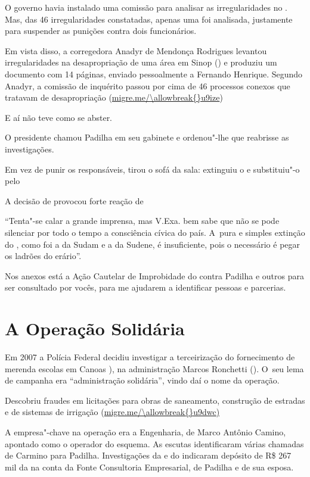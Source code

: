 O governo havia instalado uma comissão para analisar as irregularidades
no . Mas, das 46 irregularidades constatadas, apenas uma foi
analisada, justamente para suspender as punições contra dois
funcionários.

Em vista disso, a corregedora Anadyr de Mendonça Rodrigues levantou
irregularidades na desapropriação de uma área em Sinop () e produziu
um documento com 14 páginas, enviado pessoalmente a Fernando Henrique.
Segundo Anadyr, a comissão de inquérito passou por cima de 46 processos
conexos que tratavam de desapropriação (\url{migre.me/\allowbreak{}u9ize})

E aí  não teve como se abster.

O presidente chamou Padilha em seu gabinete e ordenou"-lhe que reabrisse
as investigações.

Em vez de punir os responsáveis,  tirou o sofá da sala: extinguiu o
 e substituiu"-o pelo 

A decisão de  provocou forte reação de 

``Tenta"-se calar a grande imprensa, mas V.Exa. bem sabe que não se pode
silenciar por todo o tempo a consciência cívica do país. A~pura e
simples extinção do , como foi a da Sudam e a da Sudene, é
insuficiente, pois o necessário é pegar os ladrões do erário''.

Nos anexos está a Ação Cautelar de Improbidade do  contra Padilha e
outros para ser consultado por vocês, para me ajudarem a identificar
pessoas e parcerias.

\section{A Operação Solidária}

Em 2007 a Polícia Federal decidiu investigar a terceirização do
fornecimento de merenda escolas em Canoas ), na administração Marcos
Ronchetti (). O~seu lema de campanha era ``administração
solidária'', vindo daí o nome da operação.

Descobriu fraudes em licitações para obras de saneamento, construção de
estradas e de sistemas de irrigação (\url{migre.me/\allowbreak{}u9dwc)}

A empresa"-chave na operação era a  Engenharia, de Marco Antônio
Camino, apontado como o operador do esquema. As escutas identificaram
várias chamadas de Carmino para Padilha. Investigações da  e do 
indicaram depósito de R\$ 267 mil da  na conta da Fonte Consultoria
Empresarial, de Padilha e de sua esposa.

